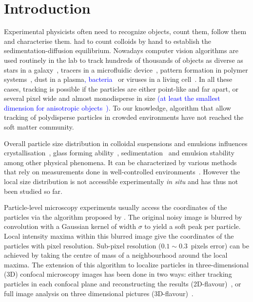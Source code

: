 \documentclass[8.5pt,twoside,twocolumn]{article}
\begin{document}



\section{Introduction}

Experimental physicists often need to recognize objects, count them, follow them and characterise them. \citet{perrin} had to count colloids by hand to establish the sedimentation-diffusion equilibrium. Nowadays computer vision algorithms are used routinely in the lab to track hundreds of thousands of objects as diverse as stars in a galaxy~\cite{Bertin1996}, tracers in a microfluidic device~\cite{Wereley2010}, pattern formation in polymer systems~\cite{tanaka1986application,tanaka1989digital}, dust in a plasma\textcolor{blue}{, bacteria~\cite{Zhang2010,Gibiansky2010}} or viruses in a living cell~\cite{Brandenburg2007}. In all these cases, tracking is possible if the particles are either point-like and far apart, or several pixel wide and almost monodisperse in size \textcolor{blue}{(at least the smallest dimension for anisotropic objects~\cite{Zhang2010,Gibiansky2010})}. To our knowledge, algorithm that allow tracking of polydisperse particles in crowded environments have not reached the soft matter community.

Overall particle size distribution in colloidal suspensions and emulsions influences crystallisation~\cite{Pusey1987,Henderson1996,Fasolo2003,Schope2007,pusey2009hard}, glass forming ability~\cite{Pusey1987,Henderson1996,Senkov2001,Schope2007,pusey2009hard}, sedimentation~\cite{Binks1998,Leocmach2010} and emulsion stability~\cite{Biben1993,Binks1998} among other physical phenomena. It can be characterized by various methods that rely on measurements done in well-controlled environments~\cite{Lange1995,Provder1997,Finder2004}. However the local size distribution is not accessible experimentally \emph{in situ} and has thus not been studied so far.

Particle-level microscopy experiments usually access the coordinates of the particles via the algorithm proposed by \citet{Crocker1996}. The original noisy image is blurred by convolution with a Gaussian kernel of width $\sigma$ to yield a soft peak per particle. Local intensity maxima within this blurred image give the coordinates of the particles with pixel resolution. Sub-pixel resolution ($0.1\sim0.3$~pixels error) can be achieved by taking the centre of mass of a neighbourhood around the local maxima. The extension of this algorithm to localize particles in three-dimensional (3D) confocal microscopy images has been done in two ways: either tracking particles in each confocal plane and reconstructing the results (2D-flavour)~\citep{vanblaaderen1995rss, Lu2007}, or full image analysis on three dimensional pictures (3D-flavour)~\citep{dinsmore2001tdc}.
\end{document}
